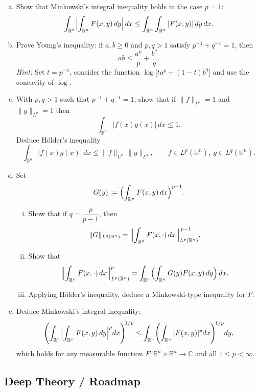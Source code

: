 \documentclass[12pt,a4paper]{article}
\theoremstyle{plain}
\theoremstyle{definition}
\theoremstyle{remark}
\theoremstyle{remark}
\begin{document}
\begin{enumerate}[(a)]
	\item Show that Minkowski's integral inequality holds in the case $p=1$:
	\[
	\int_{\mathbb{R}^n}\Bigl|\int_{\mathbb{R}^n} F(x,y)\,dy\Bigr|\,dx
	\le \int_{\mathbb{R}^n}\int_{\mathbb{R}^n} |F(x,y)|\,dy\,dx.
	\]
	
	\item Prove Young's inequality: if $a,b\ge 0$ and $p,q>1$ satisfy
	$p^{-1}+q^{-1}=1$, then
	\[
	ab \le \frac{a^p}{p} + \frac{b^q}{q}.
	\]
	\emph{Hint:} Set $t=p^{-1}$, consider the function
	$\log\bigl[t a^p + (1-t)b^q\bigr]$ and use the concavity of $\log$.
	
	\item With $p,q>1$ such that $p^{-1}+q^{-1}=1$, show that if
	$\|f\|_{L^p}=1$ and $\|g\|_{L^q}=1$ then
	\[
	\int_{\mathbb{R}^n} |f(x)g(x)|\,dx \le 1.
	\]
	Deduce Hölder's inequality
	\[
	\int_{\mathbb{R}^n} |f(x)g(x)|\,dx \le
	\|f\|_{L^p}\,\|g\|_{L^q},
	\qquad f\in L^p(\mathbb{R}^n),\ g\in L^q(\mathbb{R}^n).
	\]
	
	\item Set
	\[
	G(y) := \Bigl(\int_{\mathbb{R}^n} F(x,y)\,dx\Bigr)^{p-1}.
	\]
	\begin{enumerate}[i)]
		\item Show that if $q=\dfrac{p}{p-1}$, then
		\[
		\|G\|_{L^q(\mathbb{R}^n)}
		= \Bigl\|\int_{\mathbb{R}^n} F(x,\cdot)\,dx\Bigr\|_{L^p(\mathbb{R}^n)}^{\,p-1}.
		\]
		\item Show that
		\[
		\Bigl\|\int_{\mathbb{R}^n} F(x,\cdot)\,dx\Bigr\|_{L^p(\mathbb{R}^n)}^p
		= \int_{\mathbb{R}^n}
		\Bigl(\int_{\mathbb{R}^n} G(y)F(x,y)\,dy\Bigr)\,dx.
		\]
		\item Applying Hölder's inequality, deduce a Minkowski-type inequality
		for $F$.
	\end{enumerate}
	
	\item Deduce Minkowski's integral inequality:
	\[
	\Biggl(\int_{\mathbb{R}^n}
	\Bigl|\int_{\mathbb{R}^n} F(x,y)\,dy\Bigr|^p dx\Biggr)^{\!1/p}
	\le
	\int_{\mathbb{R}^n}
	\Biggl(\int_{\mathbb{R}^n} |F(x,y)|^p dx\Biggr)^{\!1/p} dy,
	\]
	which holds for any measurable function
	$F:\mathbb{R}^n\times\mathbb{R}^n\to\mathbb{C}$ and all $1\le p<\infty$.
\end{enumerate}

\subsection*{Deep Theory / Roadmap}
\end{document}
